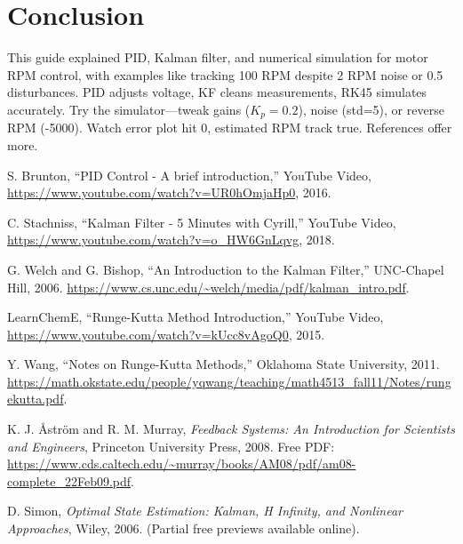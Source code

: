 \documentclass[conference]{IEEEtran}
\begin{document}
	\section{Conclusion}
	\label{sec:conclusion}
	This guide explained PID, Kalman filter, and numerical simulation for motor RPM control, with examples like tracking 100 RPM despite 2 RPM noise or 0.5 disturbances. PID adjusts voltage, KF cleans measurements, RK45 simulates accurately. Try the simulator—tweak gains ($K_p=0.2$), noise (std=5), or reverse RPM (-5000). Watch error plot hit 0, estimated RPM track true. References offer more.
	
	
	
	
	\begin{thebibliography}{1}
		S. Brunton, ``PID Control - A brief introduction,'' YouTube Video, \url{https://www.youtube.com/watch?v=UR0hOmjaHp0}, 2016.
		
		C. Stachniss, ``Kalman Filter - 5 Minutes with Cyrill,'' YouTube Video, \url{https://www.youtube.com/watch?v=o_HW6GnLqvg}, 2018.
		
		G. Welch and G. Bishop, ``An Introduction to the Kalman Filter,'' UNC-Chapel Hill, 2006. \url{https://www.cs.unc.edu/~welch/media/pdf/kalman_intro.pdf}.
		
		LearnChemE, ``Runge-Kutta Method Introduction,'' YouTube Video, \url{https://www.youtube.com/watch?v=kUcc8vAgoQ0}, 2015.
		
		Y. Wang, ``Notes on Runge-Kutta Methods,'' Oklahoma State University, 2011. \url{https://math.okstate.edu/people/yqwang/teaching/math4513_fall11/Notes/rungekutta.pdf}.
		
		K. J. Åström and R. M. Murray, \emph{Feedback Systems: An Introduction for Scientists and Engineers}, Princeton University Press, 2008. Free PDF: \url{https://www.cds.caltech.edu/~murray/books/AM08/pdf/am08-complete_22Feb09.pdf}.
		
		D. Simon, \emph{Optimal State Estimation: Kalman, H Infinity, and Nonlinear Approaches}, Wiley, 2006. (Partial free previews available online).
		
	\end{thebibliography}
	
\end{document}
